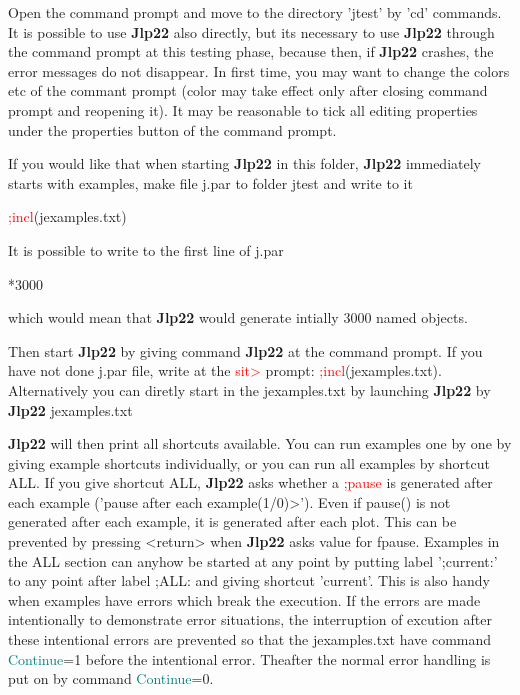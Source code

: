 Open the command prompt and move to the directory 'jtest' by 'cd' commands. 
It is possible to use \textbf{Jlp22} also directly, but its necessary to use \textbf{Jlp22} through the command prompt 
at this testing phase, because then, if \textbf{Jlp22} crashes, the error messages do not disappear. 
In first time, you may want to change 
the colors etc of the commant prompt (color may take effect only after 
closing command prompt and reopening it). It may be reasonable to tick all editing 
properties under the properties button of the command prompt. 
 
If you would like that when starting \textbf{Jlp22} in this folder, \textbf{Jlp22} immediately starts with examples, 
make file j.par to folder jtest and write 
to it 
 
\textcolor{Red}{;incl}(jexamples.txt) 
 
It is possible to write to the first line of j.par 
 
*3000 
 
which would mean that \textbf{Jlp22} would generate intially 3000 named objects. 
 
 
Then start \textbf{Jlp22} by giving command \textbf{Jlp22} at the command prompt. 
If you have not done j.par file, write at the \textcolor{Red}{sit>} prompt:  \textcolor{Red}{;incl}(jexamples.txt). 
Alternatively you can diretly start in the jexamples.txt by launching \textbf{Jlp22} by\\ 
\textbf{Jlp22} jexamples.txt 
 
\textbf{Jlp22} will then print all shortcuts available. You can run examples one by one by giving example shortcuts 
individually, or you can run all examples by shortcut ALL. If you give shortcut ALL, \textbf{Jlp22} asks whether 
a \textcolor{Red}{;pause} is generated after each example ('pause after each example(1/0)>'). 
Even if \textcolor{VioletRed}{pause}() is not generated after each example, it is generated after each plot. 
This can be prevented by pressing <return> when \textbf{Jlp22} asks value for fpause. Examples in the ALL section can anyhow be started 
at any point by putting label ';current:' to any point after label ;ALL: and giving shortcut 
'current'. This is also handy when examples have errors which break the execution. If the errors are made 
intentionally to demonstrate error situations, the interruption of excution after these intentional errors are 
prevented so that the jexamples.txt have command \textcolor{teal}{Continue}=1 before the intentional error. Theafter the normal 
error handling is put on by command \textcolor{teal}{Continue}=0. 
 

